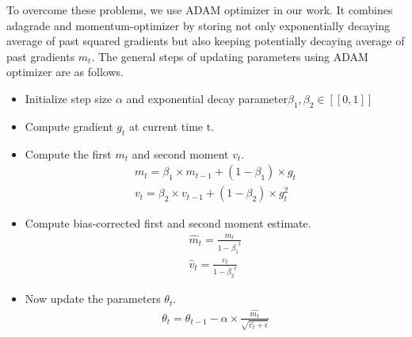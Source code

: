 \begin{itemize}
To overcome these problems, we use ADAM optimizer in our work. It combines adagrade\cite{Adagrade} and momentum-optimizer\cite{momentum} by storing not only exponentially decaying average of past squared gradients but also keeping potentially decaying average of past gradients $m_t$. The general steps of updating parameters using ADAM optimizer are as follows.
\begin{itemize}
    \item Initialize step size $\alpha$ and exponential decay parameter$\beta_1, \beta_2  \in [\![ 0,1]\!]$
    \item Compute gradient $g_t$ at current time t.
    \item Compute the first $m_t$ and second moment $v_t$.
    \begin{equation*}\label{eq:moment}
        \begin{aligned}
            m_t = \beta_1 \times m_{t-1} + \left ( 1 - \beta_1 \right ) \times g_t \\
            v_t= \beta_2 \times v_{t-1} + \left ( 1 - \beta_2 \right ) \times g_t^{2}
        \end{aligned}
    \end{equation*}
    \item Compute bias-corrected first  and second moment estimate.
     \begin{equation*}\label{eq:moment2}
        \begin{aligned}
            \widehat{m}_t = \frac{m_t}{1-{\beta_1}^{t}} \\
            \widehat{v}_t = \frac{v_t}{1-{\beta_2}^{t}}
        \end{aligned}
    \end{equation*}
    \item Now update the parameters $\theta_t$.
    \begin{equation*}\label{eq:moment3}
        \begin{aligned}
            \theta_t =\theta_{t-1} - \alpha \times \frac{\widehat{m_{t}}}{\sqrt{\widehat{v_t} + \epsilon }}
        \end{aligned}
    \end{equation*}
\end{itemize}

\end{itemize}
 